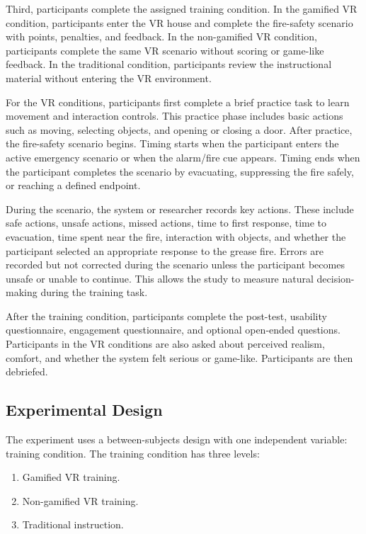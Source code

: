 \documentclass[manuscript, review]{acmart}
\begin{document}
{Third, participants complete the assigned training condition. In the gamified VR condition, participants enter the VR house and complete the fire-safety scenario with points, penalties, and feedback. In the non-gamified VR condition, participants complete the same VR scenario without scoring or game-like feedback. In the traditional condition, participants review the instructional material without entering the VR environment.

For the VR conditions, participants first complete a brief practice task to learn movement and interaction controls. This practice phase includes basic actions such as moving, selecting objects, and opening or closing a door. After practice, the fire-safety scenario begins. Timing starts when the participant enters the active emergency scenario or when the alarm/fire cue appears. Timing ends when the participant completes the scenario by evacuating, suppressing the fire safely, or reaching a defined endpoint.

During the scenario, the system or researcher records key actions. These include safe actions, unsafe actions, missed actions, time to first response, time to evacuation, time spent near the fire, interaction with objects, and whether the participant selected an appropriate response to the grease fire. Errors are recorded but not corrected during the scenario unless the participant becomes unsafe or unable to continue. This allows the study to measure natural decision-making during the training task.

After the training condition, participants complete the post-test, usability questionnaire, engagement questionnaire, and optional open-ended questions. Participants in the VR conditions are also asked about perceived realism, comfort, and whether the system felt serious or game-like. Participants are then debriefed.

\subsection{Experimental Design}

The experiment uses a between-subjects design with one independent variable: training condition. The training condition has three levels:

\begin{enumerate}
  \item Gamified VR training.
  \item Non-gamified VR training.
  \item Traditional instruction.
\end{enumerate}

}
\end{document}
